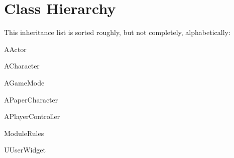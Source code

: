 \section{Class Hierarchy}
This inheritance list is sorted roughly, but not completely, alphabetically\+:\begin{DoxyCompactList}
\item A\+Actor\begin{DoxyCompactList}
\item {}
\item {}
\end{DoxyCompactList}
\item A\+Character\begin{DoxyCompactList}
\item {}
\end{DoxyCompactList}
\item A\+Game\+Mode\begin{DoxyCompactList}
\item {}
\end{DoxyCompactList}
\item A\+Paper\+Character\begin{DoxyCompactList}
\item {}
\end{DoxyCompactList}
\item A\+Player\+Controller\begin{DoxyCompactList}
\item {}
\end{DoxyCompactList}
\item {}
\item {}
\item {}
\item Module\+Rules\begin{DoxyCompactList}
\item {}
\end{DoxyCompactList}
\item U\+User\+Widget\begin{DoxyCompactList}
\item {}
\end{DoxyCompactList}
\end{DoxyCompactList}
